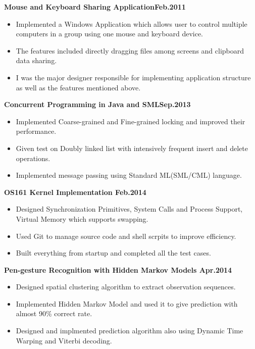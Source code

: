 \documentclass{myres}
\begin{document}
{
	\par
	\textbf{Mouse and Keyboard Sharing Application\hfill Feb.2011}
	\begin{itemize}[topsep=0pt, leftmargin=0.2in] \itemsep -5pt
		\item Implemented a Windows Application which allows user to control multiple computers in a group using one mouse and keyboard device. 
		\item The features included directly dragging files among screens and clipboard data sharing. 
		\item I was the major designer responsible for implementing application structure as well as the
					features mentioned above.
	\end{itemize}

	\par
	\smallskip

	\textbf{Concurrent Programming in Java and SML\hfill Sep.2013}
	\begin{itemize}[topsep=0pt, leftmargin=0.2in] \itemsep -5pt
		\item Implemented Coarse-grained and Fine-grained locking and improved their performance.
		\item Given test on Doubly linked list with intensively frequent insert and delete operations.
		\item Implemented message passing using Standard ML(SML/CML) language.	
	\end{itemize}

	\par
	\smallskip

	\textbf{OS161 Kernel Implementation \hfill Feb.2014}
	\begin{itemize}[topsep=0pt, leftmargin=0.2in] \itemsep -5pt
		\item Designed Synchronization Primitives, System Calls and Process Support, Virtual Memory
			which supports swapping.
		\item Used Git to manage source code and shell scrpits to improve efficiency.
		\item Built everything from startup and completed all the test cases. 
	\end{itemize}

	\par
	\smallskip

	\textbf{Pen-gesture Recognition with Hidden Markov Models \hfill Apr.2014}
	\begin{itemize}[topsep=0pt, leftmargin=0.2in] \itemsep -5pt
			\item Designed spatial clustering algorithm to extract observation sequences.
			\item Implemented Hidden Markov Model and used it to give prediction with almost 90\% correct rate.
			\item Designed and implmented prediction algorithm also using Dynamic Time Warping and Viterbi decoding. 
	\end{itemize}	

}
\end{document}
